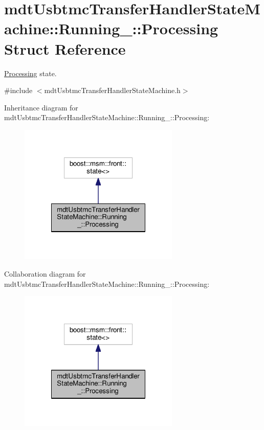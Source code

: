 \hypertarget{structmdt_usbtmc_transfer_handler_state_machine_1_1_running___1_1_processing}{\section{mdt\-Usbtmc\-Transfer\-Handler\-State\-Machine\-:\-:Running\-\_\-\-:\-:Processing Struct Reference}
\label{structmdt_usbtmc_transfer_handler_state_machine_1_1_running___1_1_processing}
}


\hyperlink{structmdt_usbtmc_transfer_handler_state_machine_1_1_running___1_1_processing}{Processing} state.  




{\ttfamily \#include $<$mdt\-Usbtmc\-Transfer\-Handler\-State\-Machine.\-h$>$}



Inheritance diagram for mdt\-Usbtmc\-Transfer\-Handler\-State\-Machine\-:\-:Running\-\_\-\-:\-:Processing\-:
\nopagebreak
\begin{figure}[H]
\begin{center}
\leavevmode
\includegraphics[width=216pt]{structmdt_usbtmc_transfer_handler_state_machine_1_1_running___1_1_processing__inherit__graph}
\end{center}
\end{figure}


Collaboration diagram for mdt\-Usbtmc\-Transfer\-Handler\-State\-Machine\-:\-:Running\-\_\-\-:\-:Processing\-:
\nopagebreak
\begin{figure}[H]
\begin{center}
\leavevmode
\includegraphics[width=216pt]{structmdt_usbtmc_transfer_handler_state_machine_1_1_running___1_1_processing__coll__graph}
\end{center}
\end{figure}
